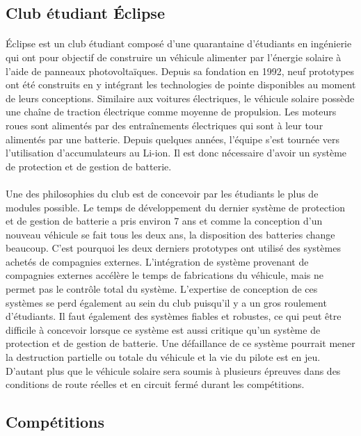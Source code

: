 	\subsection{Club étudiant Éclipse}
	
	\paragraph{}
	Éclipse est un club étudiant composé d'une quarantaine d'étudiants en ingénierie qui ont pour objectif de construire un véhicule alimenter par l'énergie solaire à l'aide de panneaux photovoltaïques. Depuis sa fondation en 1992, neuf prototypes ont été construits en y intégrant les technologies de pointe disponibles au moment de leurs conceptions. Similaire aux voitures électriques, le véhicule solaire possède une chaîne de traction électrique comme moyenne de propulsion. Les moteurs roues sont alimentés par des entraînements électriques qui sont à leur tour alimentés par une batterie. Depuis quelques années, l'équipe s'est tournée vers l'utilisation d'accumulateurs au Li-ion. Il est donc nécessaire d'avoir un système de protection et de gestion de batterie.
	
	\paragraph{}
	Une des philosophies du club est de concevoir par les étudiants le plus de modules possible. Le temps de développement du dernier système de protection et de gestion de batterie a pris environ 7 ans et comme la conception d'un nouveau véhicule se fait tous les deux ans, la disposition des batteries change beaucoup. C'est pourquoi les deux derniers prototypes ont utilisé des systèmes achetés de compagnies externes. L'intégration de système provenant de compagnies externes accélère le temps de fabrications du véhicule, mais ne permet pas le contrôle total du système. L'expertise de conception de ces systèmes se perd également au sein du club puisqu'il y a un gros roulement d'étudiants. Il faut également des systèmes fiables et robustes, ce qui peut être difficile à concevoir lorsque ce système est aussi critique qu'un système de protection et de gestion de batterie. Une défaillance de ce système pourrait mener la destruction partielle ou totale du véhicule et la vie du pilote est en jeu. D'autant plus que le véhicule solaire sera soumis à plusieurs épreuves dans des conditions de route réelles et en circuit fermé durant les compétitions.
	
	\subsection{Compétitions}

